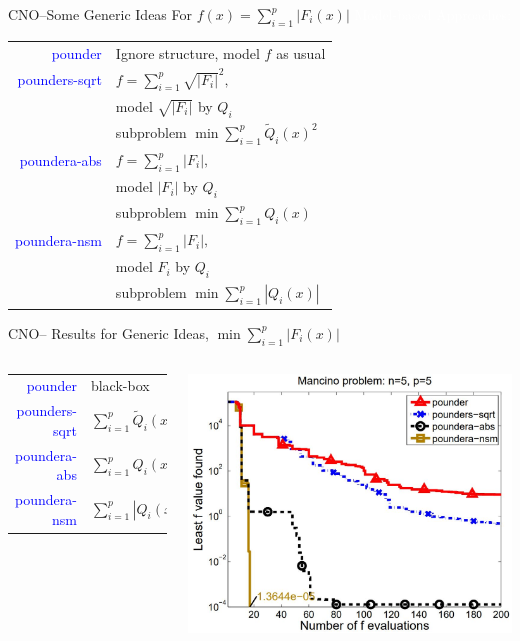 \documentclass[handout,aspectratio=54]{beamer}
\numberwithin{theorem}{section}
\begin{document}
\begin{frame}{CNO–Some Generic Ideas For $f(x)=\sum_{i=1}^p|F_i(x)|$}
\colorbox[rgb]{0.5,0.6,0.7}{\textcolor{white}{Model-based Approaches:}}

\begin{tabular}{rl}
\textcolor{blue}{pounder} & Ignore structure, model $f$ as usual\\
\textcolor{blue}{pounders-sqrt} & $f=\sum_{i=1}^p\sqrt{|F_i|}^2,$\\
& model $\sqrt{|F_i|}$ by $Q_i$\\
& subproblem $\min\sum_{i=1}^p\tilde{Q}_i(x)^2$\\
\textcolor{blue}{poundera-abs } & $f=\sum_{i=1}^p|F_i|,$\\
& model $|F_i|$ by $Q_i$\\
& subproblem $\min\sum_{i=1}^pQ_i(x)$\\
\textcolor{blue}{poundera-nsm } & $f=\sum_{i=1}^p|F_i|,$\\
& model $F_i$ by $Q_i$\\
& subproblem $\min\sum_{i=1}^p|Q_i(x)|$
\end{tabular}
\end{frame}

\begin{frame}{CNO– Results for Generic Ideas, $\min\sum_{i=1}^p|F_i(x)|$}
\begin{columns}
\scriptsize
\begin{tabular}{rl}
\textcolor{blue}{pounder} & black-box\\
\textcolor{blue}{pounders-sqrt} & $\sum_{i=1}^p\tilde{Q}_i(x)^2$\\
\textcolor{blue}{poundera-abs} & $\sum_{i=1}^pQ_i(x)$\\
\textcolor{blue}{poundera-nsm} & $\sum_{i=1}^p|Q_i(x)|$
\end{tabular}

\includegraphics[width=\textwidth]{fig/50-1.jpg}
\end{columns}
\end{frame}
\end{document}
